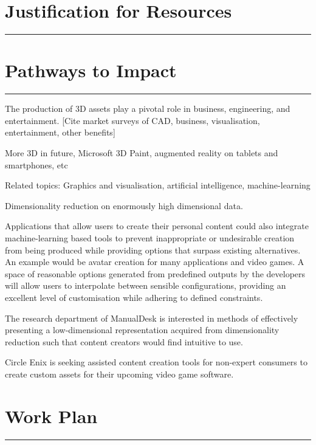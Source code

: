 \documentclass[a4paper, fontsize=15pt, onecolumn]{article} %
\numberwithin{equation}{section} %
\numberwithin{figure}{section} %
\numberwithin{table}{section} %
\begin{document}
\newpage

\section*{Justification for Resources}
\hrule
\newpage

\section*{Pathways to Impact}
\hrule
The production of 3D assets play a pivotal role in business, engineering, and entertainment.
[Cite market surveys of CAD, business, visualisation, entertainment, other benefits]

More 3D in future, Microsoft 3D Paint, augmented reality on tablets and smartphones, etc

Related topics: Graphics and visualisation, artificial intelligence, machine-learning

Dimensionality reduction on enormously high dimensional data.

Applications that allow users to create their personal content could also integrate machine-learning based tools to prevent inappropriate or undesirable creation from being produced while providing options that surpass existing alternatives. An example would be avatar creation for many applications and video games. A space of reasonable options generated from predefined outputs by the developers will allow users to interpolate between sensible configurations, providing an excellent level of customisation while adhering to defined constraints.

The research department of ManualDesk is interested in methods of effectively presenting a low-dimensional representation acquired from dimensionality reduction such that content creators would find intuitive to use.

Circle Enix is seeking assisted content creation tools for non-expert consumers to create custom assets for their upcoming video game software.

\newpage

\section*{Work Plan}
\hrule
\end{document}
